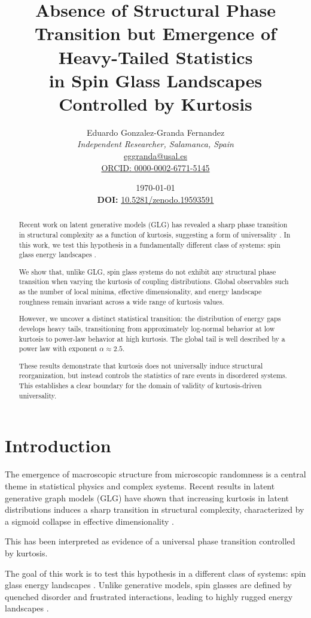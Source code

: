 \documentclass[11pt]{article}
\title{
Absence of Structural Phase Transition but Emergence of Heavy-Tailed Statistics \\
in Spin Glass Landscapes Controlled by Kurtosis
}
\author{Eduardo Gonzalez-Granda Fernandez\\
\textit{Independent Researcher, Salamanca, Spain}\\
\href{mailto:eggranda@usal.es}{eggranda@usal.es}\\
\href{https://orcid.org/0000-0002-6771-5145}{ORCID: 0000-0002-6771-5145}
}
\date{\today \\ \vspace{0.4cm} 
\textbf{DOI:} \href{https://doi.org/10.5281/10.5281/zenodo.19593591}{10.5281/zenodo.19593591}}
\begin{document}
\maketitle

\begin{abstract}

Recent work on latent generative models (GLG) has revealed a sharp phase transition in structural complexity as a function of kurtosis, suggesting a form of universality \citep{gonzalez2023m18}. In this work, we test this hypothesis in a fundamentally different class of systems: spin glass energy landscapes \citep{mezard1987spin, binder1986spin}.

We show that, unlike GLG, spin glass systems do not exhibit any structural phase transition when varying the kurtosis of coupling distributions. Global observables such as the number of local minima, effective dimensionality, and energy landscape roughness remain invariant across a wide range of kurtosis values.

However, we uncover a distinct statistical transition: the distribution of energy gaps develops heavy tails, transitioning from approximately log-normal behavior at low kurtosis to power-law behavior at high kurtosis. The global tail is well described by a power law with exponent $\alpha \approx 2.5$.

These results demonstrate that kurtosis does not universally induce structural reorganization, but instead controls the statistics of rare events in disordered systems. This establishes a clear boundary for the domain of validity of kurtosis-driven universality.

\end{abstract}

\section{Introduction}

The emergence of macroscopic structure from microscopic randomness is a central theme in statistical physics and complex systems. Recent results in latent generative graph models (GLG) have shown that increasing kurtosis in latent distributions induces a sharp transition in structural complexity, characterized by a sigmoid collapse in effective dimensionality \citep{gonzalez2023m18}.

This has been interpreted as evidence of a universal phase transition controlled by kurtosis.

The goal of this work is to test this hypothesis in a different class of systems: spin glass energy landscapes \citep{young1998spin, talagrand2003spin}. Unlike generative models, spin glasses are defined by quenched disorder and frustrated interactions, leading to highly rugged energy landscapes \citep{derrida1980random, derrida1981random}.
\end{document}
